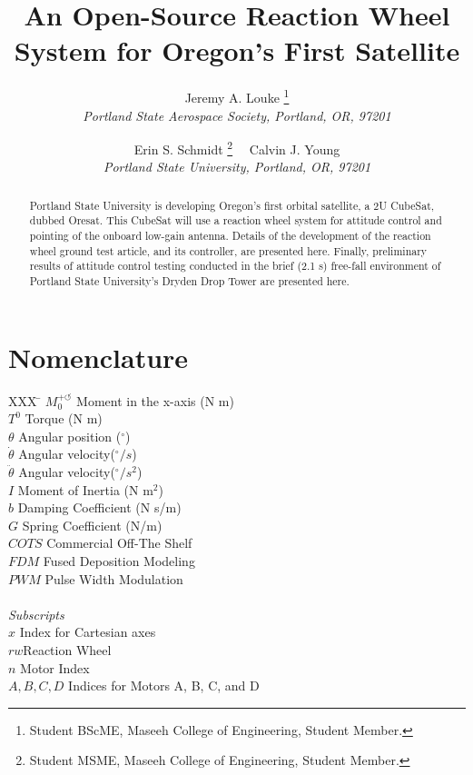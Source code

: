 \documentclass[]{aiaa-tc}%
\title{An Open-Source Reaction Wheel System for Oregon's First Satellite}
\author{
  Jeremy A. Louke%
  	\thanks{Student BScME, Maseeh College of Engineering, Student Member.}\\
  {\normalsize\itshape
   Portland State Aerospace Society, Portland, OR, 97201}\\
  \and
  Erin S. Schmidt%
  	\thanks{Student MSME, Maseeh College of Engineering, Student Member.} \ \
  Calvin J. Young\thanksibid{1}\\
  {\normalsize\itshape
  Portland State University, Portland, OR, 97201}
 }
\begin{document}
\maketitle

\begin{abstract}
Portland State University is developing Oregon's first orbital satellite, a 2U CubeSat, dubbed Oresat. This CubeSat will use a reaction wheel system for attitude control and pointing of the onboard low-gain antenna. Details of the development of the reaction wheel ground test article, and its controller, are presented here. Finally, preliminary results of attitude control testing conducted in the brief (2.1 s) free-fall environment of Portland State University's Dryden Drop Tower are presented here. 
\end{abstract}

\section*{Nomenclature}

\begin{center}
\parbox{0cm}
{\begin{tabbing}
  XXX \= \kill%
  $M_0^{+ \circlearrowleft}$ \qquad Moment in the x-axis (N m)\\
  $T^0$ \qquad Torque (N m)\\
  $\theta$ \qquad Angular position (${}^{\circ}$)\\
  $\dot{\theta}$ \qquad Angular velocity(${}^{\circ}/s$)\\ 
  $\ddot{\theta}$ \qquad Angular velocity(${}^{\circ}/s^2$) \\
  $I$ \qquad Moment of Inertia (N $\textrm{m}^2$)\\
  $b$ \qquad Damping Coefficient (N s/m)\\ 
  $G$ \qquad Spring Coefficient (N/m)\\
  $COTS$ \qquad Commercial Off-The Shelf\\
  $FDM$ \qquad Fused Deposition Modeling\\
  $PWM$ \qquad Pulse Width Modulation\\ \\
  \textit{Subscripts}\\
  $x$ \qquad Index for Cartesian axes \\
  $rw$\qquad Reaction Wheel\\
  $n$ \qquad Motor Index\\
  $A, B, C, D$ \qquad Indices for Motors A, B, C, and D\\
 \end{tabbing}}
 \end{center}
 
\end{document}

